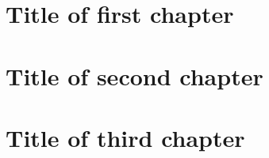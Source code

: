 \documentclass[a4paper,oneside]{book}
\begin{document}
\chapter{Title of first chapter}
\begin{refsection}
\end{refsection}

\chapter{Title of second chapter}
\begin{refsection}
\end{refsection}

\chapter{Title of third chapter}
\begin{refsection}
\end{refsection}

\printbibheading
\bibbysection[heading=subbibliography]
%
%
\end{document}
